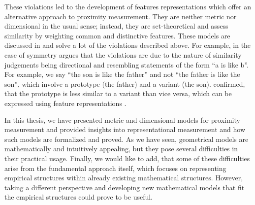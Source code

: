 These violations led to the development of features representations which offer an alternative approach to proximity measurement.
They are neither metric nor dimensional in the usual sense; instead, they are set-theoretical and assess similarity by weighting common and distinctive features. These models are discussed in \textcite[Chapter 14.7]{foundations2} and solve a lot of the violations described above. For example, in the case of symmetry \textcite{tverskyFeaturesSimilarity1977a} argues that the violations are due to the nature of similarity judgements being directional and resembling statements of the form ``a is like b''. For example, we say ``the son is like the father'' and not ``the father is like the son'', which involve a prototype (the father) and a variant (the son). \textcite{tverskyStudiesSimilarity1979} confirmed, that the prototype is less similar to a variant than vice versa, which can be expressed using feature representations \parencite[pp. 215-216]{foundations2}.

In this thesis, we have presented metric and dimensional models for proximity measurement and provided insights into representational measurement and how such models are formalized and proved.
As we have seen, geometrical models are mathematically and intuitively appealing, but they pose several difficulties in their practical usage.
Finally, we would like to add, that some of these difficulties arise from the fundamental approach itself, which focuses on representing empirical structures within already existing mathematical structures.
However, taking a different perspective and developing new mathematical models that fit the empirical structures could prove to be useful.
